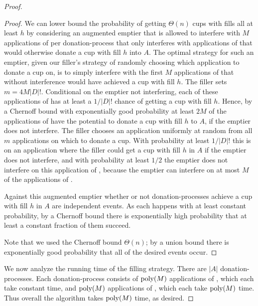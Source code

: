\begin{proof}
\begin{proof}
  We can lower bound the probability of getting $\Theta(n)$ cups
  with fills all at least $h$ by considering an augmented emptier
  that is allowed to interfere with $M$ applications of \randalg
  per donation-process that only interferes with applications of
  \randalg that would otherwise donate a cup with fill $h$ into $A$. 
  The optimal strategy for such an emptier, given our filler's
  strategy of randomly choosing which application to donate a cup
  on, is to simply interfere with the first $M$ applications of
  \randalg that without interference would have achieved a cup
  with fill $h$. The filler sets $m = 4M|D|!$. Conditional on
  the emptier not interfering, each of these applications of
  \randalg has at least a $1/|D|!$ chance of getting a cup with
  fill $h$. Hence, by a Chernoff bound with exponentially good
  probability at least $2M$ of the applications of \randalg have
  the potential to donate a cup with fill $h$ to $A$, if the
  emptier does not interfere. The filler chooses an application
  uniformly at random from all $m$ applications on which to
  donate a cup. With probability at least $1/|D|!$ this is on an
  application where the filler could get a cup with fill $h$ in
  $A$ if the emptier does not interfere, and with probability at
  least $1/2$ the emptier does not interfere on this application
  of \randalg, because the emptier can interfere on at most $M$
  of the applications of \randalg. 

  Against this augmented emptier whether or not 
  donation-processes achieve a cup with fill $h$ in $A$ are
  independent events. As each happens with at least constant
  probability, by a Chernoff bound there is exponentially high
  probability that at least a constant fraction of them succeed.

  Note that we used the Chernoff bound $\Theta(n)$; by a union
  bound there is exponentially good probability that all of the
  desired events occur.

\end{proof}

We now analyze the running time of the filling strategy.
There are $|A|$ donation-processes. Each donation-process
consists of $\operatorname{\text{poly}}(M)$ applications of \randalg, which each take
constant time, and $\operatorname{\text{poly}}(M)$
applications of \flatalg, which each take $\operatorname{\text{poly}}(M)$ time.
Thus overall the algorithm takes $\operatorname{\text{poly}}(M)$ time, as desired.

  
\end{proof}

